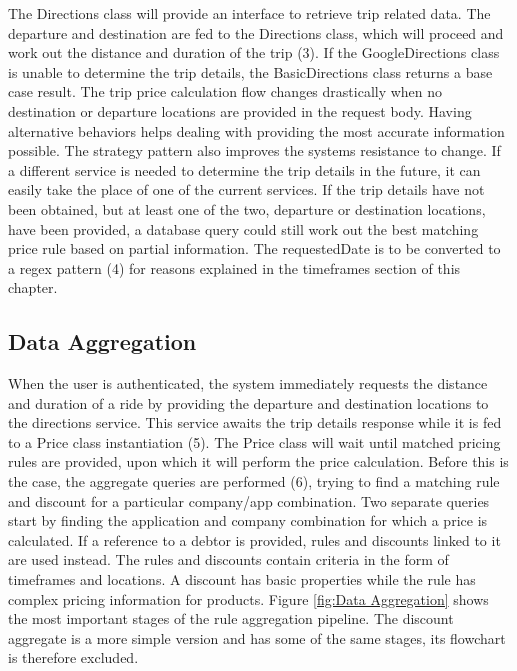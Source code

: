 The Directions class will provide an interface to retrieve trip related data. The departure and destination are fed to the Directions class, which will proceed and work out the distance and duration of the trip (3). If the GoogleDirections class is unable to determine the trip details, the BasicDirections class returns a base case result. The trip price calculation flow changes drastically when no destination or departure locations are provided in the request body. Having alternative behaviors helps dealing with providing the most accurate information possible. The strategy pattern also improves the systems resistance to change. If a different service is needed to determine the trip details in the future, it can easily take the place of one of the current services. If the trip details have not been obtained, but at least one of the two, departure or destination locations, have been provided, a database query could still work out the best matching price rule based on partial information. The requestedDate is to be converted to a regex pattern (4) for reasons explained in the timeframes section of this chapter.

\subsection{Data Aggregation}
When the user is authenticated, the system immediately requests the distance and duration of a ride by providing the departure and destination locations to the directions service. This service awaits the trip details response while it is fed to a Price class instantiation (5). The Price class will wait until matched pricing rules are provided, upon which it will perform the price calculation. Before this is the case, the aggregate queries are performed (6), trying to find a matching rule and discount for a particular company/app combination. Two separate queries start by finding the application and company combination for which a price is calculated. If a reference to a debtor is provided, rules and discounts linked to it are used instead. The rules and discounts contain criteria in the form of timeframes and locations. A discount has basic properties while the rule has complex pricing information for products. Figure \ref{fig:Data Aggregation} shows the most important stages of the rule aggregation pipeline. The discount aggregate is a more simple version and has some of the same stages, its flowchart is therefore excluded.


